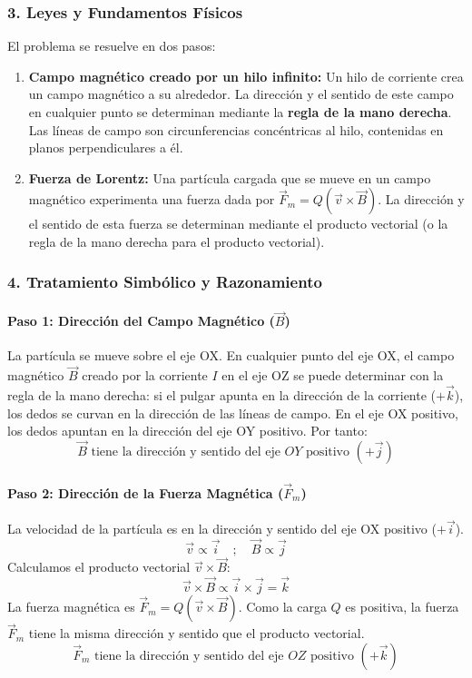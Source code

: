 \subsubsection*{3. Leyes y Fundamentos Físicos}
El problema se resuelve en dos pasos:
\begin{enumerate}
    \item \textbf{Campo magnético creado por un hilo infinito:} Un hilo de corriente crea un campo magnético a su alrededor. La dirección y el sentido de este campo en cualquier punto se determinan mediante la \textbf{regla de la mano derecha}. Las líneas de campo son circunferencias concéntricas al hilo, contenidas en planos perpendiculares a él.
    \item \textbf{Fuerza de Lorentz:} Una partícula cargada que se mueve en un campo magnético experimenta una fuerza dada por $\vec{F}_m = Q(\vec{v} \times \vec{B})$. La dirección y el sentido de esta fuerza se determinan mediante el producto vectorial (o la regla de la mano derecha para el producto vectorial).
\end{enumerate}

\subsubsection*{4. Tratamiento Simbólico y Razonamiento}
\paragraph{Paso 1: Dirección del Campo Magnético ($\vec{B}$)}
La partícula se mueve sobre el eje OX. En cualquier punto del eje OX, el campo magnético $\vec{B}$ creado por la corriente $I$ en el eje OZ se puede determinar con la regla de la mano derecha: si el pulgar apunta en la dirección de la corriente ($+\vec{k}$), los dedos se curvan en la dirección de las líneas de campo. En el eje OX positivo, los dedos apuntan en la dirección del eje OY positivo. Por tanto:
$$ \vec{B} \text{ tiene la dirección y sentido del eje } OY \text{ positivo } (+\vec{j}) $$

\paragraph{Paso 2: Dirección de la Fuerza Magnética ($\vec{F}_m$)}
La velocidad de la partícula es en la dirección y sentido del eje OX positivo ($+\vec{i}$).
$$ \vec{v} \propto \vec{i} \quad ; \quad \vec{B} \propto \vec{j} $$
Calculamos el producto vectorial $\vec{v} \times \vec{B}$:
$$ \vec{v} \times \vec{B} \propto \vec{i} \times \vec{j} = \vec{k} $$
La fuerza magnética es $\vec{F}_m = Q(\vec{v} \times \vec{B})$. Como la carga $Q$ es positiva, la fuerza $\vec{F}_m$ tiene la misma dirección y sentido que el producto vectorial.
$$ \vec{F}_m \text{ tiene la dirección y sentido del eje } OZ \text{ positivo } (+\vec{k}) $$

